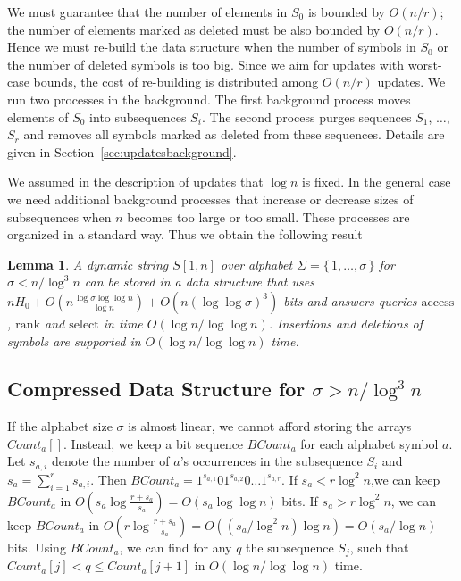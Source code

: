 \documentclass[11pt]{article}\usepackage{fullpage}
\def\idrm#1{\ensuremath{\mathrm{#1}}}
\newcommand{\no}[1]{}
\newtheorem{lemma}{Lemma}
\newcommand{\ra}{\idrm{rank}}
\newcommand{\sel}{\idrm{select}}
\newcommand{\acc}{\idrm{access}}
\newcommand{\shortver}[1]{}
\begin{document}
We must guarantee that the number of elements in $S_0$ is bounded by $O(n/r)$; the number of elements marked as deleted must be also bounded by $O(n/r)$. Hence we must re-build the data structure when the number of symbols in $S_0$ or the number of deleted symbols is too big. Since we aim for updates with worst-case bounds, the cost of re-building is distributed among $O(n/r)$ updates. We run two processes in the background. The first background process moves elements of $S_0$ into subsequences $S_i$. The second process purges sequences $S_1$, $\ldots$, $S_r$ and removes all symbols marked as deleted from these sequences. Details are given in Section~\ref{sec:updatesbackground}. 


We assumed in the description of updates that $\log n$ is fixed. In the general case we need additional background processes that increase or decrease sizes of subsequences when $n$ becomes too large or too small. These processes are organized in a standard way. \no{and will be described in the full version of this paper.}
Thus we obtain the following result
\begin{lemma}
  \label{lemma:midsigma}
A dynamic string $S[1,n]$  over alphabet $\Sigma=\{\,1,\ldots,\sigma\,\}$ for $\sigma<n/\log^3 n$
can be stored in a data structure that uses $nH_0 + O(n\frac{\log\sigma\log\log n}{\log n})+ O(n(\log\log \sigma)^3)$ bits and answers queries
$\acc$, $\ra$ and $\sel$ in time $O(\log n/\log \log n)$.
Insertions and deletions of symbols are supported in $O(\log n /\log \log n)$ time. 
\end{lemma}
\shortver{In the full version of this paper we show that the space usage of the above described data structure can be reduced to $nH_k + o(n\log\sigma)$ bits. We also show how the result of Lemma~\ref{lemma:midsigma} can be extended to the case when $\sigma\ge n/\log^3 n$.  The full version also contains the description of the static data structure and presents the procedure for extracting a substring $S[i..i+\ell]$ of $S$ in 
$O(\log n/\log \log n +\ell)$ time.}

\subsection{Compressed Data Structure for $\sigma > n/\log^3 n$}
\label{sec:bigsigma}
If the alphabet size $\sigma$ is almost linear, we cannot afford storing the arrays 
$Count_a[]$. 
Instead, we keep a bit sequence $BCount_a$ for each alphabet symbol $a$.
Let $s_{a,i}$ denote the number of $a$'s occurrences in the subsequence $S_i$ and $s_a=\sum_{i=1}^r s_{a,i}$. Then  $BCount_a=1^{s_{a,1}}01^{s_{a,2}}0\ldots 1^{s_{a,r}}$. 
If $s_a<r\log^2n$,we can keep $BCount_a$ in $O(s_a\log\frac{r + s_a}{s_a})= O(s_a\log\log n)$ bits.
If $s_a>r\log^2 n$, we can keep $BCount_a$ in $O(r\log\frac{r + s_a}{s_a})= O((s_a/\log^2n)\log n)=O(s_a/\log n)$ bits.
Using $BCount_a$, we can find for any $q$ the subsequence $S_j$, such that $Count_a[j]< q \le Count_a[j+1]$ in $O(\log n/\log \log n)$ time.
\end{document}
